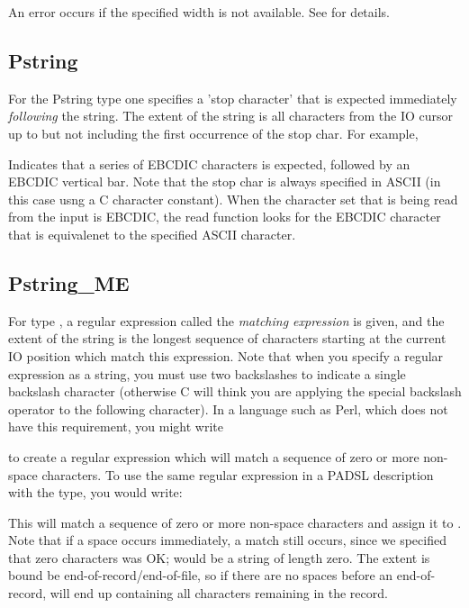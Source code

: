 An error occurs if the specified width is not available.  See 
for details.

\subsection{Pstring}

\aedBegin{}
\aedEnd{}

For the Pstring type one specifies a 'stop character' that is
expected immediately {\em following\/} the string.  The extent of the
string is all characters from the IO cursor up
to but not including the first occurrence of the stop char.
For example,

%
\noindent
Indicates that a series of EBCDIC characters is expected, followed by
an EBCDIC vertical bar.  Note that the stop char is always specified
in ASCII (in this case usng a C character constant).  When the
character set that is being read from the input is EBCDIC, the read
function looks for the EBCDIC character that is equivalenet to the
specified ASCII character.

\subsection{Pstring\_ME}

\aedBegin{}
\aedEnd{}

For type , a regular expression called the {\em matching
expression\/} is given, and the extent of the string is the longest
sequence of characters starting at the current IO position which match
this expression.  Note that when you specify a regular expression as
a \C{} string, you must use two backslashes to indicate a single
backslash character (otherwise C will think you are applying the
special backslash operator to the following character). 
In a language such as Perl, which does not have this requirement,
you might write

%
\noindent
to create a regular expression which will match a
sequence of zero or more non-space characters.  To use the
same regular expression in a PADSL description
with the  type, you would write:

%
\noindent
This will match a sequence of zero or more non-space characters and assign
it to .  Note that if a space occurs immediately, a match
still occurs, since we specified that zero characters was OK;
 would be a string of length zero.  The extent is bound be
end-of-record/end-of-file, so if there are no spaces before an
end-of-record,  will end up containing all characters
remaining in the record.

